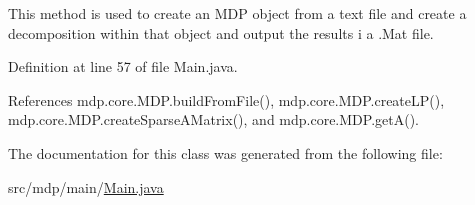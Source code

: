 This method is used to create an M\+D\+P object from a text file and create a decomposition within that object and output the results i a .Mat file. 



Definition at line 57 of file Main.\+java.



References mdp.\+core.\+M\+D\+P.\+build\+From\+File(), mdp.\+core.\+M\+D\+P.\+create\+L\+P(), mdp.\+core.\+M\+D\+P.\+create\+Sparse\+A\+Matrix(), and mdp.\+core.\+M\+D\+P.\+get\+A().



The documentation for this class was generated from the following file\+:\begin{DoxyCompactItemize}
\item 
src/mdp/main/\hyperlink{_main_8java}{Main.\+java}\end{DoxyCompactItemize}
